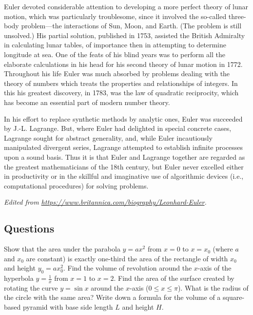 Euler devoted considerable attention to developing a more perfect theory of lunar motion, which was particularly troublesome, since it involved the so-called three-body problem—the interactions of Sun, Moon, and Earth. (The problem is still unsolved.) His partial solution, published in 1753, assisted the British Admiralty in calculating lunar tables, of importance then in attempting to determine longitude at sea. One of the feats of his blind years was to perform all the elaborate calculations in his head for his second theory of lunar motion in 1772. Throughout his life Euler was much absorbed by problems dealing with the theory of numbers which treats the properties and relationships of integers. In this his greatest discovery, in 1783, was the law of quadratic reciprocity, which has become an essential part of modern number theory.

In his effort to replace synthetic methods by analytic ones, Euler was succeeded by J.-L. Lagrange. But, where Euler had delighted in special concrete cases, Lagrange sought for abstract generality, and, while Euler incautiously manipulated divergent series, Lagrange attempted to establish infinite processes upon a sound basis. Thus it is that Euler and Lagrange together are regarded as the greatest mathematicians of the 18th century, but Euler never excelled either in productivity or in the skillful and imaginative use of algorithmic devices (i.e., computational procedures) for solving problems.

\textit{Edited from \url{https://www.britannica.com/biography/Leonhard-Euler}.}

\subsection*{Questions}
\begin{questions}
  \question Show that the area under the parabola $ y = ax^2 $ from $ x = 0 $ to $ x = x_0 $ (where $ a $ and $ x_0 $ are constant)
            is exactly one-third the area of the rectangle of width $ x_0 $ and height $ y_0 = ax_0^2 $.
  \question Find the volume of revolution around the $ x$-axis of the hyperbola $ y = \frac{1}{x} $ from $ x = 1 $ to $ x = 2 $.
  \question Find the area of the surface created by rotating the curve $ y = \sin x $ around the $ x$-axis ($ 0 \leq x \leq \pi $).
            What is the radius of the circle with the same area?
  \question Write down a formula for the volume of a square-based pyramid with base side length $ L $ and height $ H $.
\end{questions}

